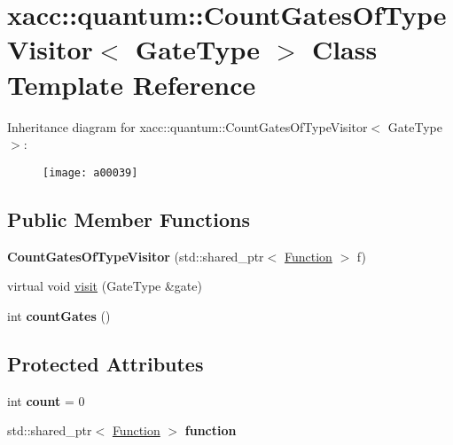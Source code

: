 \hypertarget{a00039}{}\section{xacc\+:\+:quantum\+:\+:Count\+Gates\+Of\+Type\+Visitor$<$ Gate\+Type $>$ Class Template Reference}
\label{a00039}
Inheritance diagram for xacc\+:\+:quantum\+:\+:Count\+Gates\+Of\+Type\+Visitor$<$ Gate\+Type $>$\+:\begin{figure}[H]
\begin{center}
\leavevmode
\texttt{[image: a00039]}
\end{center}
\end{figure}
\subsection*{Public Member Functions}
\begin{DoxyCompactItemize}
\item 
{\bfseries Count\+Gates\+Of\+Type\+Visitor} (std\+::shared\+\_\+ptr$<$ \hyperlink{a00059}{Function} $>$ f)\hypertarget{a00039_a4c2507e3ee4fe51e7ff4501bf5569cfc}{}\label{a00039_a4c2507e3ee4fe51e7ff4501bf5569cfc}

\item 
virtual void \hyperlink{a00039_a9c40e6cb4b74e2d6714c531ffc3b2909}{visit} (Gate\+Type \&gate)
\item 
int {\bfseries count\+Gates} ()\hypertarget{a00039_a8a1a17ed50cd6727c2eb07976f886389}{}\label{a00039_a8a1a17ed50cd6727c2eb07976f886389}

\end{DoxyCompactItemize}
\subsection*{Protected Attributes}
\begin{DoxyCompactItemize}
\item 
int {\bfseries count} = 0\hypertarget{a00039_ae3d8ae4c40c1552ee68aa6e5002e42bd}{}\label{a00039_ae3d8ae4c40c1552ee68aa6e5002e42bd}

\item 
std\+::shared\+\_\+ptr$<$ \hyperlink{a00059}{Function} $>$ {\bfseries function}\hypertarget{a00039_a202ab6e0e365af735da706fe972333e7}{}\label{a00039_a202ab6e0e365af735da706fe972333e7}

\end{DoxyCompactItemize}



